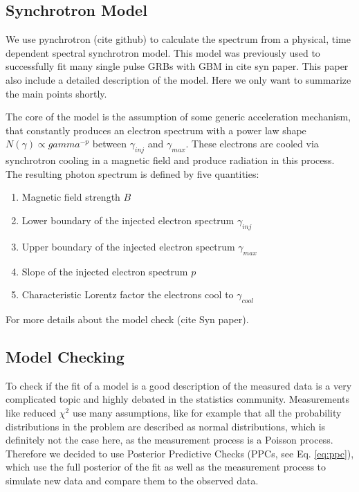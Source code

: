 \documentclass[twocolumn]{aa}
\begin{document}
\subsection{Synchrotron Model}

We use pynchrotron (cite github) to calculate the spectrum from a physical, time dependent spectral synchrotron model. This model was previously used to successfully fit many single pulse GRBs with GBM in cite syn paper. This paper also include a detailed description of the model. Here we only want to summarize the main points shortly.

The core of the model is the assumption of some generic acceleration mechanism, that constantly produces an electron spectrum with a power law shape $N(\gamma )\propto gamma^{-p}$ between $\gamma_{inj}$ and $\gamma_{max}$. These electrons are cooled via synchrotron cooling in a magnetic field and produce radiation in this process. The resulting photon spectrum is defined by five quantities:

\begin{enumerate}
	\item Magnetic field strength $B$
  \item Lower boundary of the injected electron spectrum $\gamma_{inj}$
  \item Upper boundary of the injected electron spectrum $\gamma_{max}$
  \item Slope of the injected electron spectrum $p$
  \item Characteristic Lorentz factor the electrons cool to $\gamma_{cool}$
\end{enumerate}

For more details about the model check (cite Syn paper).

\subsection{Model Checking}
\label{PPC}
To check if the fit of a model is a good description of the measured data is a very complicated topic and highly debated in the statistics community. Measurements like reduced $\chi^{2}$ use many assumptions, like for example that all the probability distributions in the problem are described as normal distributions, which is definitely not the case here, as the measurement process is a Poisson process. Therefore we decided to use Posterior Predictive Checks (PPCs, see Eq. \ref{eq:ppc}), which use the full posterior of the fit as well as the measurement process to simulate new data and compare them to the observed data.
\end{document}
